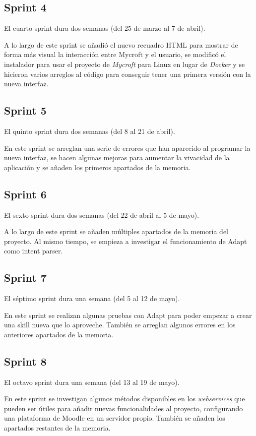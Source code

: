 \subsection{Sprint 4}
El cuarto sprint dura dos semanas (del 25 de marzo al 7 de abril).

A lo largo de este sprint se añadió el nuevo recuadro HTML para mostrar de forma más visual la interacción entre Mycroft y el usuario, se modificó el instalador para usar el proyecto de \textit{Mycroft} para Linux en lugar de \textit{Docker} y se hicieron varios arreglos al código para conseguir tener una primera versión con la nueva interfaz.
\subsection{Sprint 5}
El quinto sprint dura dos semanas (del 8 al 21 de abril).

En este sprint se arreglan una serie de errores que han aparecido al programar la nueva interfaz, se hacen algunas mejoras para aumentar la vivacidad de la aplicación y se añaden los primeros apartados de la memoria.
\subsection{Sprint 6}
El sexto sprint dura dos semanas (del 22 de abril al 5 de mayo).

A lo largo de este sprint se añaden múltiples apartados de la memoria del proyecto. Al mismo tiempo, se empieza a investigar el funcionamiento de Adapt como intent parser.
\subsection{Sprint 7}
El séptimo sprint dura una semana (del 5 al 12 de mayo).

En este sprint se realizan algunas pruebas con Adapt para poder empezar a crear una skill nueva que lo aproveche. También se arreglan algunos errores en los anteriores apartados de la memoria.
\subsection{Sprint 8}
El octavo sprint dura una semana (del 13 al 19 de mayo).

En este sprint se investigan algunos métodos disponibles en los \textit{webservices} que pueden ser útiles para añadir nuevas funcionalidades al proyecto, configurando una plataforma de Moodle en un servidor propio. También se añaden los apartados restantes de la memoria.

